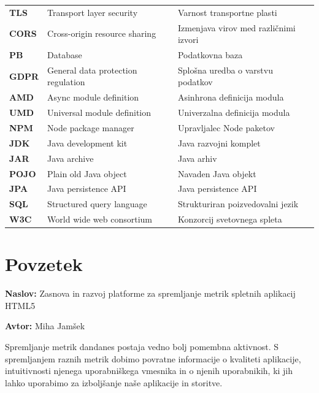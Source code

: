 \documentclass[a4paper, 12pt]{book}
\newcommand{\ttitle}{Zasnova in razvoj platforme za spremljanje metrik spletnih aplikacij HTML5}
\newcommand{\tauthor}{Miha Jamšek}
\newcommand{\clearemptydoublepage}{\newpage{\pagestyle{empty}\cleardoublepage}}
\begin{document}
\noindent\begin{tabular}{p{}|p{}|p{}}    %
  {\bf TLS}   & Transport layer security  & Varnost transportne plasti \\
  {\bf CORS}   & Cross-origin resource sharing  & Izmenjava virov med različnimi izvori \\
  {\bf PB}   & Database    & Podatkovna baza \\
  {\bf GDPR}   & General data protection regulation  & Splošna uredba o varstvu podatkov  \\
  {\bf AMD}   & Async module definition   & Asinhrona definicija modula \\
  {\bf UMD}   & Universal module definition    & Univerzalna definicija modula \\
  {\bf NPM}   & Node package manager   & Upravljalec Node paketov \\
  {\bf JDK}   & Java development kit  & Java razvojni komplet \\
  {\bf JAR}   & Java archive  & Java arhiv \\
  {\bf POJO}   & Plain old Java object  & Navaden Java objekt \\
  {\bf JPA}   & Java persistence API    & Java persistence API \\
  {\bf SQL}   & Structured query language   & Strukturiran poizvedovalni jezik \\
  {\bf W3C}   & World wide web consortium    & Konzorcij svetovnega spleta \\
\end{tabular}



\clearemptydoublepage

\chapter*{Povzetek}


\noindent\textbf{Naslov:} \ttitle
\bigskip

\noindent\textbf{Avtor:} \tauthor
\bigskip

\noindent Spremljanje metrik dandanes postaja vedno bolj pomembna aktivnost. S spremljanjem raznih metrik  dobimo povratne informacije o kvaliteti aplikacije, intuitivnosti njenega uporabniškega vmesnika in o njenih uporabnikih, ki jih lahko uporabimo za izboljšanje naše aplikacije in storitve.
\end{document}
